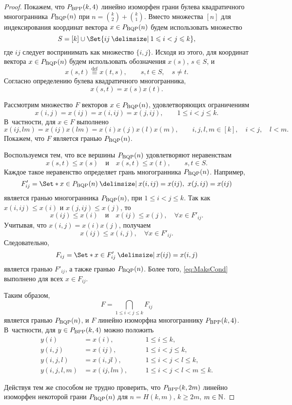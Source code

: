 \begin{proof}
Покажем, что $P_{\textup{BPP}}(k,4)$ линейно изоморфен грани булева квадратичного многогранника $P_{\textup{BQP}}(n)$	при $n = \binom{k}{2} + \binom{k}{1}$.
Вместо множества $[n]$ для индексирования координат вектора $x \in P_{\textup{BQP}}(n)$ будем использовать множество 
\[
S = [k] \cup \Set{ij \given 1 \le i < j \le k},
\]
где $ij$ следует воспринимать как множество $\{i,j\}$.
Исходя из этого, для координат вектора $x \in P_{\textup{BQP}}(n)$ будем использовать обозначения $x(s)$, $s\in S$, и
\[
x(s,t) \stackrel{\mathrm{def}}{\equiv} x(t,s), \qquad s,t\in S, \quad s \neq t.
\]
Согласно определению булева квадратичного многогранника,
\[
x(s,t) = x(s) x(t).
\]

Рассмотрим множество $F$ векторов $x \in P_{\textup{BQP}}(n)$, удовлетворяющих ограничениям
\begin{equation}
\label{eq:MaksCond}
x(i,j) = x(ij) = x(i,ij) = x(j,ij), \qquad 1\le i < j \le k.
\end{equation}
В~частности, для $x\in F$ выполнено 
\[
x(ij,lm) = x(ij) x(lm) = x(i) x(j) x(l) x(m), \qquad  i,j,l,m \in [k], \quad i < j, \quad l < m.
\]
Покажем, что $F$ является гранью $P_{\textup{BQP}}(n)$.
	
Воспользуемся тем, что все вершины $P_{\textup{BQP}}(n)$ удовлетворяют неравенствам
\[
x(s,t) \le x(s) \quad \text{и} \quad x(s,t) \le x(t), \qquad s,t\in S.
\]
Каждое такое неравенство определяет грань многогранника $P_{\textup{BQP}}(n)$.
Например,
\[
F'_{ij} = \Set*{ x \in \BQP(n) \given x(i,ij) = x(ij), \ x(j,ij) = x(ij) }
\]
является гранью многогранника $P_{\textup{BQP}}(n)$, при $1\le i < j \le k$.
Так как $x(i,ij) \le x(i)$ и $x(j,ij) \le x(j)$, то
\[
x(ij) \le x(i) \quad \text{и} \quad x(ij) \le x(j), \quad \forall x \in F'_{ij}.
\]
Учитывая, что $x(i,j) = x(i) x(j)$, получаем
\[
x(ij) \le x(i,j), \quad \forall x \in F'_{ij}.
\]
Следовательно, 
\[
F_{ij} = \Set*{x \in F'_{ij} \given x(ij) = x(i,j)}
\]
является гранью $F'_{ij}$, а также гранью $P_{\textup{BQP}}(n)$.
Более того, \eqref{eq:MaksCond} выполнено для всех $x \in F_{ij}$.
	
Таким образом,
\[
F = \bigcap_{1\le i < j \le k} F_{ij}
\]
является гранью $P_{\textup{BQP}}(n)$, и $F$ линейно изоморфна многограннику $P_{\textup{BPP}}(k,4)$.
В~частности, для $y \in P_{\textup{BPP}}(k,4)$ можно положить
\[
\begin{aligned}
	y(i) &= x(i),    &\quad &1 \le i \le k,\\
	y(i,j) &= x(ij),   &\quad &1 \le i < j \le k,\\
	y(i,j,l) &= x(i,jl), &\quad &1 \le i < j < l \le k,\\
	y(i,j,l,m) &= x(ij,lm), &\quad &1 \le i < j < l < m \le k.
\end{aligned}
\]
	
Действуя тем же способом не трудно проверить, что $P_{\textup{BPP}}(k, 2m)$ линейно изоморфен некоторой грани $P_{\textup{BQP}}(n)$ для $n = H(k,m)$, $k \ge 2m$, $m \in \mathbb{N}$.
\end{proof}

